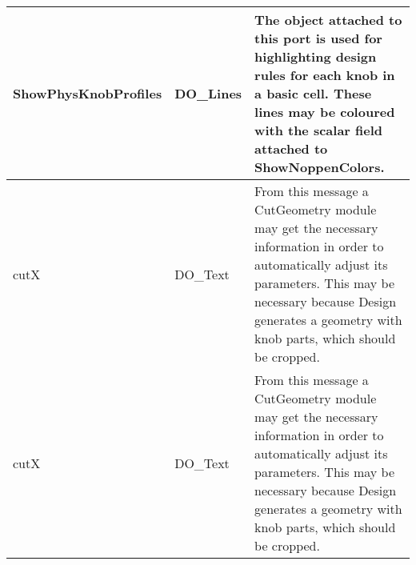 \begin{htmlonly}
\begin{longtable}{|p{3.5cm}|p{4cm}|p{7cm}|}
\hline
	\textcolor{required}{ShowPhysKnobProfiles} & DO\_Lines & 
                   The object attached to this port is used
                   for highlighting design rules for each
                   knob in a basic cell. These lines may be coloured
                   with the scalar field attached to ShowNoppenColors.\\
\hline
	\textcolor{required}{cutX} & DO\_Text & 
                   From this message a CutGeometry module
                   may get the necessary information in order
                   to automatically adjust its parameters. This
                   may be necessary because Design generates a
                   geometry with knob parts, which should be
                   cropped.\\
\hline
	\textcolor{required}{cutX} & DO\_Text & 
                   From this message a CutGeometry module
                   may get the necessary information in order
                   to automatically adjust its parameters. This
                   may be necessary because Design generates a
                   geometry with knob parts, which should be
                   cropped.\\
                    

\hline
\end{longtable}



\end{htmlonly}
